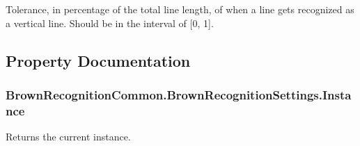 \-Tolerance, in percentage of the total line length, of when a line gets recognized as a vertical line. \-Should be in the interval of \mbox{[}0, 1\mbox{]}. 



\subsection{\-Property \-Documentation}
\hypertarget{class_brown_recognition_common_1_1_brown_recognition_settings_a86b3f25a8b13cce61cb05a1f51b0feaa}{
\subsubsection[{\-Instance}]{ \-Brown\-Recognition\-Common.\-Brown\-Recognition\-Settings.\-Instance}}
\label{class_brown_recognition_common_1_1_brown_recognition_settings_a86b3f25a8b13cce61cb05a1f51b0feaa}


\-Returns the current instance. 

